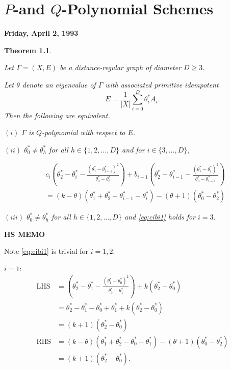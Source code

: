 \documentclass[
]{book}
\newtheorem{theorem}{Theorem}[chapter]
\theoremstyle{definition}
\theoremstyle{definition}
\theoremstyle{definition}
\theoremstyle{definition}
\theoremstyle{remark}
\begin{document}
\hypertarget{lec27}{%
\chapter{\texorpdfstring{\(P\)-and \(Q\)-Polynomial Schemes}{P-and Q-Polynomial Schemes}}\label{lec27}}

\textbf{Friday, April 2, 1993}

\begin{theorem}
\protect\hypertarget{thm:p-and-q}{}\label{thm:p-and-q}

Let \(\Gamma = (X,E)\) be a distance-regular graph of diameter \(D\geq 3\).

Let \(\theta\) denote an eigenvalue of \(\Gamma\) with associated primitive idempotent
\[E = \frac{1}{|X|}\sum_{i=0}^D \theta^*_iA_i.\]
Then the following are equivalent.

\((i)\) \(\Gamma\) is \(Q\)-polynomial with respect to \(E\).

\((ii)\) \(\theta^*_0\neq \theta^*_h\) for all \(h\in \{1, 2, \ldots, D\}\) and for \(i\in \{3, \ldots, D\}\),

\begin{align}
& c_i\left(\theta^*_2 - \theta^*_i - \frac{(\theta^*_1-\theta^*_{i-1})^2}{\theta^*_0-\theta^*_i}\right) + b_{i-1}\left(\theta^*_2 - \theta^*_{i-1} - \frac{(\theta^*_1-\theta^*_{i})^2}{\theta^*_0-\theta^*_{i-1}}\right)\\
& = (k-\theta)(\theta^*_1+\theta^*_2-\theta^*_{i-1}-\theta^*_i)-(\theta+1)(\theta^*_0-\theta^*_2) \label{eq:cibi1}
\end{align}

\((iii)\) \(\theta^*_0\neq \theta^*_h\) for all \(h\in \{1, 2, \ldots, D\}\) and \eqref{eq:cibi1} holds for \(i=3\).

\end{theorem}

\textbf{HS MEMO}

Note \eqref{eq:cibi1} is trivial for \(i = 1, 2\).

\(i=1\):
\begin{align}
\mathrm{LHS} & = \left(\theta^*_2-\theta^*_1 - \frac{(\theta^*_1-\theta^*_0)^2}{\theta^*_0-\theta^*_1}\right)+ k(\theta^*_2-\theta^*_0)\\
& = \theta^*_2-\theta^*_1 - \theta^*_0 + \theta^*_1 + k(\theta_2^*-\theta^*_0)\\
& = (k+1)(\theta^*_2-\theta^*_0)\\
\mathrm{RHS} & = (k-\theta)(\theta^*_1+\theta^*_2-\theta^*_0-\theta^*_1)-(\theta+1)(\theta^*_0-\theta^*_2)\\
& = (k+1)(\theta^*_2-\theta^*_0).
\end{align}
\end{document}
